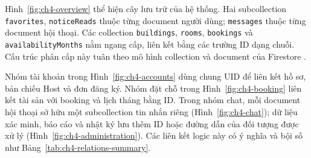 Hình~\ref{fig:ch4-overview} thể hiện cây lưu trữ của hệ thống. Hai subcollection \texttt{favorites}, \texttt{notice\allowbreak{}Reads} thuộc từng document người dùng; \texttt{messages} thuộc từng document hội thoại. Các collection \texttt{buildings}, \texttt{rooms}, \texttt{bookings} và \texttt{availability\allowbreak{}Months} nằm ngang cấp, liên kết bằng các trường ID dạng chuỗi. Cấu trúc phân cấp này tuân theo mô hình collection và document của Firestore \parencite{firebase_data_model}.



Nhóm tài khoản trong Hình~\ref{fig:ch4-accounts} dùng chung UID để liên kết hồ sơ, bản chiếu Host và đơn đăng ký. Nhóm đặt chỗ trong Hình~\ref{fig:ch4-booking} liên kết tài sản với booking và lịch tháng bằng ID. Trong nhóm chat, mỗi document hội thoại sở hữu một subcollection tin nhắn riêng (Hình~\ref{fig:ch4-chat}); dữ liệu xác minh, báo cáo và nhật ký lưu thêm ID hoặc đường dẫn của đối tượng được xử lý (Hình~\ref{fig:ch4-administration}). Các liên kết logic này có ý nghĩa và bội số như Bảng~\ref{tab:ch4-relations-summary}.

